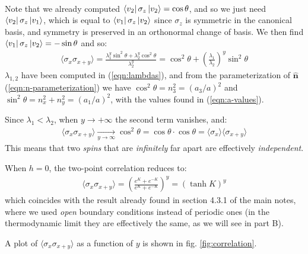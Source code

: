\documentclass[12pt,a4paper]{report}
\begin{document}
\begin{enumerate}
\begin{align*}
        \end{align*}
        Note that we already computed $\bra{v_2} \sigma_z \ket{v_2} = \cos \theta$, and so we just need $\bra{v_2} \sigma_z \ket{v_1}$, which is equal to $\bra{v_1} \sigma_z \ket{v_2}$ since $\sigma_z$ is symmetric in the canonical basis, and symmetry is preserved in an orthonormal change of basis. We then find $\bra{v_1} \sigma_z \ket{v_2} = -\sin \theta$ and so:
        \begin{align*}
            \langle \sigma_x \sigma_{x+y} \rangle = \frac{\lambda_1^y \sin^2 \theta + \lambda_2^y \cos^2 \theta}{\lambda_2^y} = \cos^2 \theta + \left(\frac{\lambda_1}{\lambda_2} \right)^y \sin^2 \theta
        \end{align*}
        $\lambda_{1,2}$ have been computed in (\ref{eqn:lambdas}), and from the parameterization of $\bm{\hat{n}}$ (\ref{eqn:n-parameterization}) we have $\cos^2 \theta = n_3^2 = (a_3/a)^2$ and $\sin^2 \theta = n_x^2 + n_y^2 = (a_1/a)^2$, with the values found in (\ref{eqn:a-values}).

        Since $\lambda_1 < \lambda_2$, when $y \to +\infty$ the second term vanishes, and:
        \begin{align*}
            \langle \sigma_x \sigma_{x+y} \rangle  \xrightarrow[y \to \infty]{}  \cos^2 \theta = \cos \theta \cdot \cos \theta = \langle \sigma_x \rangle \langle \sigma_{x+y} \rangle
        \end{align*}
        This means that two \textit{spins} that are \textit{infinitely} far apart are effectively \textit{independent}.   

        \medskip

        When $h=0$, the two-point correlation reduces to:
        \begin{align*}
            \langle \sigma_x \sigma_{x+y} \rangle = \left(\frac{e^K + e^{-K}}{e^K + e^{-K}} \right)^y = (\tanh K)^y
        \end{align*}
        which coincides with the result already found in section 4.3.1 of the main notes, where we used \textit{open} boundary conditions instead of periodic ones (in the thermodynamic limit they are effectively the same, as we will see in part B). 

        \medskip

        A plot of $\langle \sigma_x \sigma_{x+y} \rangle$ as a function of $y$ is shown in fig. \ref{fig:correlation}.

        
    \end{enumerate}
    
\end{document}
